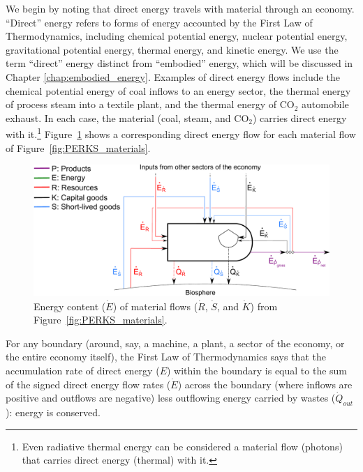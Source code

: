 We begin by noting that direct energy travels 
with material through an economy.
``Direct'' energy refers to forms of energy accounted by the 
First Law of Thermodynamics,
including chemical potential energy, 
nuclear potential energy, 
gravitational potential energy,
thermal energy, 
and kinetic energy.
We use the term ``direct'' energy distinct from ``embodied'' energy, 
which will be discussed in Chapter \ref{chap:embodied_energy}.
Examples of direct energy flows include 
the chemical potential energy of coal inflows to an energy sector, 
the thermal energy of process steam into a textile plant, and
the thermal energy of CO$_2$ automobile exhaust.
In each case, the material (coal, steam, and CO$_2$) 
carries direct energy with it.\footnote{Even 
radiative thermal energy
can be considered a material flow (photons) that carries
direct energy (thermal) with it.}
Figure~\ref{fig:PERKS_energy_content} shows a corresponding 
direct energy flow for each material flow of Figure~\ref{fig:PERKS_materials}.

\begin{figure}[h!]
\centering
\includegraphics[width=0.8\linewidth]{Part_2/Chapter_Energy/images/PERKS_basic_unit_energy_content.pdf}
\caption{Energy content ($\dot{E}$) of material flows 
($\dot{R}$, $\dot{S}$, and $\dot{K}$) 
from Figure~\ref{fig:PERKS_materials}.}
\label{fig:PERKS_energy_content}
\end{figure}

For any boundary (around, say, a machine, a plant,
a sector of the economy, or the entire economy itself), 
the First Law of Thermodynamics says that 
the accumulation rate of direct energy ($E$) within the boundary
is equal to the sum of the signed direct energy flow rates ($\dot{E}$)
across the boundary (where inflows are positive and outflows are negative)
less outflowing energy carried by wastes ($\dot{Q}_{out}$): 
energy is conserved.

